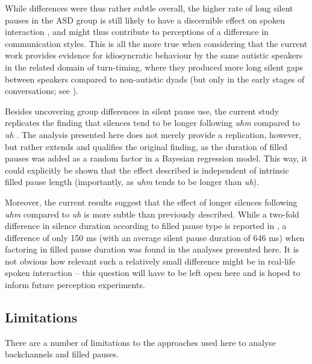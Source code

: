 While differences were thus rather subtle overall, the higher rate of long silent pauses in the ASD group is still likely to have a discernible effect on spoken interaction \citep{dejongChoosingThresholdSilent2013,goldman-eislerPsycholinguisticsExperimentsSpontaneous1968}, and might thus contribute to perceptions of a difference in communication styles. This is all the more true when considering that the current work provides evidence for idiosyncratic behaviour by the same autistic speakers in the related domain of turn-timing, where they produced more long silent gaps between speakers compared to non-autistic dyads (but only in the early stages of conversations; see ).

Besides uncovering group differences in silent pause use, the current study replicates the finding that silences tend to be longer following \emph{uhm} compared to \emph{uh} \citep{clarkUsingUhUm2002}. The analysis presented here does not merely provide a replication, however, but rather extends and qualifies the original finding, as the duration of filled pauses was added as a random factor in a Bayesian regression model. This way, it could explicitly be shown that the effect described is independent of intrinsic filled pause length (importantly, as \emph{uhm} tends to be longer than \emph{uh}).

 Moreover, the current results suggest that the effect of longer silences following \emph{uhm} compared to \emph{uh} is more subtle than previously described. While a two-fold difference in silence duration according to filled pause type is reported in \citet{clarkUsingUhUm2002}, a difference of only 150 ms (with an average silent pause duration of 646 ms) when factoring in filled pause duration was found in the analyses presented here. It is not obvious how relevant such a relatively small difference might be in real-life spoken interaction -- this question will have to be left open here and is hoped to inform future perception experiments.

 
\subsection{Limitations}\label{BCFP_Discussion_limitations}

There are a number of limitations to the approaches used here to analyse backchannels and filled pauses.

